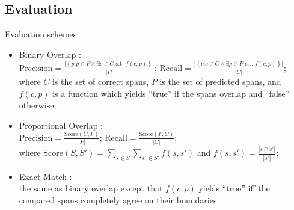 \documentclass{beamer}
\begin{document}
\subsection{Evaluation}
\begin{frame}{}
  Evaluation schemes:
  \begin{itemize}
    \scriptsize
  \item<1-> Binary Overlap \cite{Breck-07}:\\
    \begin{math}\textstyle
      \text{Precision} = \frac{|\left\{p| p \in P \wedge \exists
        c \in C \text{ s.t. } f(c,p)\right\}|}{|P|}\text{; }
      \text{Recall} = \frac{|\left\{c| c \in C \wedge \exists p
        \in P \text{ s.t. } f(c,p)\right\}|}{|C|};
    \end{math}\\
    where $C$ is the set of correct spans, $P$ is the set of
    predicted spans, and $f(c, p)$ is a function which yields
    ``true'' if the spans overlap and ``false'' otherwise;
  \item<2-> Proportional Overlap \cite{Johansson-10}:\\
    \begin{math}\textstyle
      \text{Precision} = \frac{\text{Score}(C, P)}{|P|}\text{;
      }\text{Recall} = \frac{\text{Score}(P, C)}{|C|};
    \end{math}\\
    where $\text{Score}(S, S') = \sum_{s \in S}\sum_{s' \in
      S'}f(s, s')$ and $f(s, s') = \frac{|s \cap s'|}{|s'|}$;
  \item<3-> Exact Match \cite{Breck-07}:\\ the same as
    binary overlap except that $f(c, p)$ yields ``true'' iff the
    compared spans completely agree on their boundaries.
  \end{itemize}
\end{frame}
\end{document}
